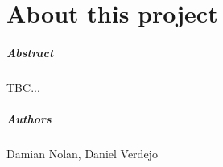 
\chapter*{About this project}
\paragraph{Abstract}

TBC...

\paragraph{Authors}
Damian Nolan, Daniel Verdejo









